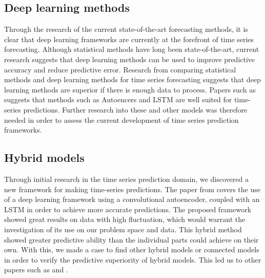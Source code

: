 \subsection{Deep learning methods}
Through the research of the current state-of-the-art forecasting methods,
it is clear that deep learning frameworks are currently at the forefront of time series forecasting.
Although statistical methods have long been state-of-the-art, current research suggests that deep learning methods can be used to improve predictive accuracy and reduce predictive error.
Research from \cite{Makridakis2018} comparing statistical methods and deep learning methods for time series forecasting suggests that deep learning methods are superior if there is enough data to process.
Papers such as \cite{Laptev} suggests that methods such as Autoencers and LSTM are well suited for time-series predictions.
Further research into these and other models was therefore needed in order to assess the current development of time series prediction frameworks.


\subsection{Hybrid models}
Through initial research in the time series prediction domain,
we discovered a new framework for making time-series predictions.
The paper from \cite{Zhao2019} covers the use of a deep learning framework using a convolutional autoencoder,
coupled with an LSTM in order to achieve more accurate predictions.
The proposed framework showed great results on data with high fluctuation,
which would warrant the investigation of its use on our problem space and data.
This hybrid method showed greater predictive ability than the individual parts could achieve on their own.
With this, we made a case to find other hybrid models or connected models in order to verify the predictive superiority of hybrid models.
This led us to other papers such as \cite{Khan2020} and \cite{Bowen2020}.




\iffalse
{}

